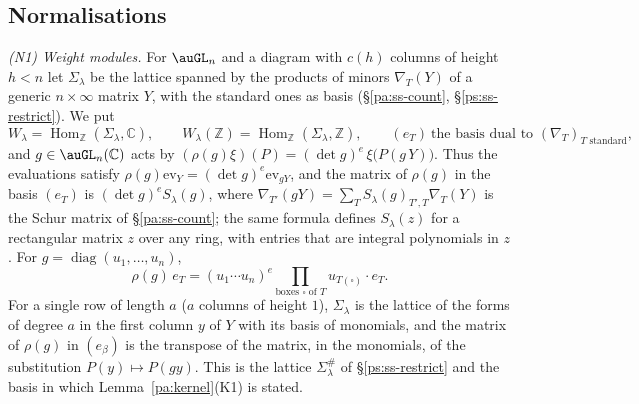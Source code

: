 \documentclass[10pt]{amsart}
\theoremstyle{definition}
\theoremstyle{remark}
\newcommand{\C}{\mathbb C}
\newcommand{\Z}{\mathbb Z}
\begin{document}
\subsection{Normalisations}\label{pl:ss-norm}
\emph{{\rm(N1)} Weight modules.} For $\auGL_n$ and a diagram with $c(h)$ columns of height $h<n$
let $\Sigma_\lambda$ be the lattice spanned by the products of minors $\nabla_T(Y)$ of a generic
$n\times\infty$ matrix $Y$, with the standard ones as basis (\S\ref{pa:ss-count},
\S\ref{ps:ss-restrict}). We put
\[
W_\lambda=\operatorname{Hom}_\Z(\Sigma_\lambda,\C),\qquad W_\lambda(\Z)=\operatorname{Hom}_\Z
(\Sigma_\lambda,\Z),\qquad(e_T)\ \text{the basis dual to }(\nabla_T)_{T\text{ standard}},
\]
and $g\in\auGL_n(\C)$ acts by $(\rho(g)\xi)(P)=(\det g)^{e}\,\xi\bigl(P(g\,Y)\bigr)$. Thus the
evaluations satisfy $\rho(g)\mathrm{ev}_Y=(\det g)^e\mathrm{ev}_{gY}$, and the matrix of $\rho(g)$
in the basis $(e_T)$ is $(\det g)^eS_\lambda(g)$, where $\nabla_{T'}(gY)=\sum_TS_\lambda(g)_{T',T}
\nabla_T(Y)$ is the Schur matrix of \S\ref{pa:ss-count}; the same formula defines $S_\lambda(z)$
for a rectangular matrix $z$ over any ring, with entries that are integral polynomials in $z$. For
$g=\operatorname{diag}(u_1,\dots,u_n)$,
\begin{equation}\label{pl:eq-diag}
\rho(g)\,e_T=(u_1\cdots u_n)^{e}\prod_{\text{boxes }\square\text{ of }T}u_{T(\square)}\cdot e_T .
\end{equation}
For a single row of length $a$ ($a$ columns of height $1$), $\Sigma_\lambda$ is the lattice of
the forms of degree $a$ in the first column $y$ of $Y$ with its basis of monomials, and the matrix
of $\rho(g)$ in $(e_\beta)$ is the transpose of the matrix, in the monomials, of the substitution
$P(y)\mapsto P(gy)$. This is the lattice $\Sigma_\lambda^{\#}$ of \S\ref{ps:ss-restrict} and the
basis in which Lemma~\ref{pa:kernel}(K1) is stated.
\end{document}

